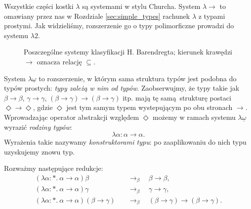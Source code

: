 Wszystkie części kostki \(\lambda\) są systemami w stylu Churcha. System \(\lambda{\to}\) to omawiany przez nas w Rozdziale \ref{sec:simple_types} rachunek \(\lambda\) z typami prostymi. Jak widzieliśmy, rozszerzenie go o typy polimorficzne prowadzi do systemu \(\lambda 2\). 

\begin{figure}
  \centering
  \caption{Poszczególne systemy klasyfikacji H. Barendregta; kierunek krawędzi \(\to\)  oznacza relację \(\subseteq\).}\label{fig:lambda-cube}
\end{figure}

System    \(\lambda{\underline{\omega}}\)   to    rozszerzenie,   w
którym   sama   struktura   typów    jest   podobna   do   typów
prostych:   \emph{typy   zależą   w  nim   od   typów}.   Zaobserwujmy,
że   typy   takie  jak   \(\beta\to\beta\),   \(\gamma\to\gamma\),
\((\beta\to\gamma)\to(\beta\to\gamma)\)   itp.    mają
tę  samą strukturę  postaci   \(\Diamond\to  \Diamond\),  gdzie
\(\Diamond\)  jest tym  samym typem  wystepującym po  obu stronach
\(\to\). Wprowadzając  operator abstrakcji  względem \(\Diamond\)
możemy w  ramach systemu  \(\lambda{\underline{\omega}}\) wyrazić
\emph{rodziny typów}:
\[
  \lambda \alpha: \alpha\to\alpha.
\]
Wyrażenia takie nazywamy \emph{konstruktorami typu}: po zaaplikowaniu do nich typu uzyskujemy znowu typ.
\begin{przyklad}
  Rozważmy następujące redukcje:
  \begin{align*}
    (\lambda \alpha : *.\ \alpha\to\alpha)\beta &\quad\to_\beta\quad \beta\to\beta,\\  
    (\lambda \alpha : *.\ \alpha\to\alpha)\gamma &\quad\to_\beta\quad \gamma\to\gamma,\\
    (\lambda \alpha : *.\ \alpha\to\alpha)(\beta\to\gamma) &\quad\to_\beta\quad (\beta\to\gamma)\to(\beta\to\gamma).
  \end{align*}
\end{przyklad}


